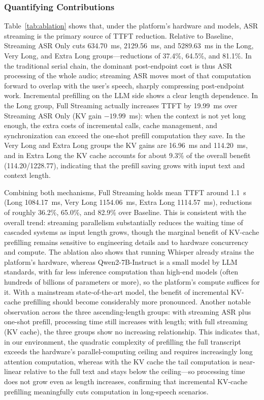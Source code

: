 \documentclass[pdflatex,iicol,Numbered,sn-basic]{sn-jnl}%
\begin{document}
\subsubsection{Quantifying Contributions}

Table~\ref{tab:ablation} shows that, under the platform's hardware and models, ASR streaming is the primary source of TTFT reduction. Relative to Baseline, Streaming ASR Only cuts 634.70~ms, 2129.56~ms, and 5289.63~ms in the Long, Very Long, and Extra Long groups---reductions of 37.4\%, 64.5\%, and 81.1\%. In the traditional serial chain, the dominant post-endpoint cost is thus ASR processing of the whole audio; streaming ASR moves most of that computation forward to overlap with the user's speech, sharply compressing post-endpoint work. Incremental prefilling on the LLM side shows a clear length dependence. In the Long group, Full Streaming actually increases TTFT by 19.99~ms over Streaming ASR Only (KV gain $-19.99$~ms): when the context is not yet long enough, the extra costs of incremental calls, cache management, and synchronization can exceed the one-shot prefill computation they save. In the Very Long and Extra Long groups the KV gains are 16.96~ms and 114.20~ms, and in Extra Long the KV cache accounts for about 9.3\% of the overall benefit (114.20/1228.77), indicating that the prefill saving grows with input text and context length.

Combining both mechanisms, Full Streaming holds mean TTFT around 1.1~s (Long 1084.17~ms, Very Long 1154.06~ms, Extra Long 1114.57~ms), reductions of roughly 36.2\%, 65.0\%, and 82.9\% over Baseline. This is consistent with the overall trend: streaming parallelism substantially reduces the waiting time of cascaded systems as input length grows, though the marginal benefit of KV-cache prefilling remains sensitive to engineering details and to hardware concurrency and compute. The ablation also shows that running Whisper already strains the platform's hardware, whereas Qwen2-7B-Instruct is a small model by LLM standards, with far less inference computation than high-end models (often hundreds of billions of parameters or more), so the platform's compute suffices for it. With a mainstream state-of-the-art model, the benefit of incremental KV-cache prefilling should become considerably more pronounced. Another notable observation across the three ascending-length groups: with streaming ASR plus one-shot prefill, processing time still increases with length; with full streaming (KV cache), the three groups show no increasing relationship. This indicates that, in our environment, the quadratic complexity of prefilling the full transcript exceeds the hardware's parallel-computing ceiling and requires increasingly long attention computation, whereas with the KV cache the tail computation is near-linear relative to the full text and stays below the ceiling---so processing time does not grow even as length increases, confirming that incremental KV-cache prefilling meaningfully cuts computation in long-speech scenarios.
\end{document}
